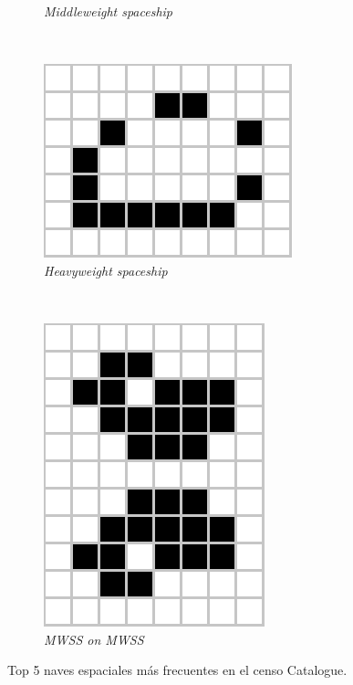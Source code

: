 \documentclass[../proyecto.tex]{memoir}
\begin{document}
\begin{figure}[H]
\begin{subfigure}[b]{0.3\linewidth}
        \caption{\textit{Middleweight spaceship}}
        \label{fig:middleweightspaceship}
    \end{subfigure}
    \\
	\begin{subfigure}[b]{0.3\linewidth} 
        \centering
        \includegraphics[height=0.45\linewidth]{./images/heavyweightspaceship.png}
        \caption{\textit{Heavyweight spaceship}}
        \label{fig:heavyweightspaceship}
    \end{subfigure}
    \
	\begin{subfigure}[b]{0.3\linewidth} 
        \centering
        \includegraphics[height=0.65\linewidth]{./images/MWSS_on_MWSS.png}
        \caption{\textit{MWSS on MWSS}}
        \label{fig:mwss2}
    \end{subfigure}
	\caption{Top 5 naves espaciales más frecuentes en el censo {Catalogue}.}
	\label{fig:congIniciales5}
\end{figure} 


\end{document}
